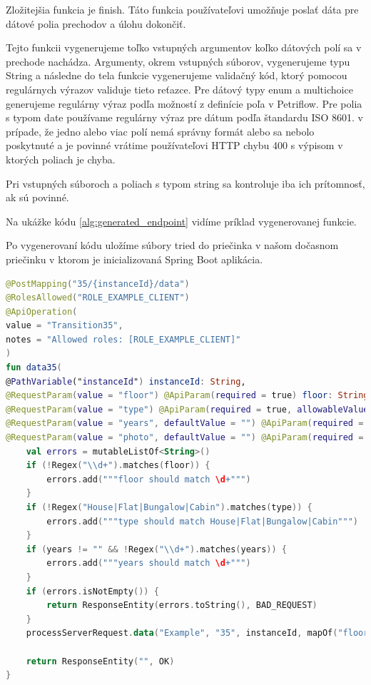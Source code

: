 
Zložitejšia funkcia je finish. Táto funkcia používateľovi umožňuje poslať dáta pre dátové polia prechodov a úlohu dokončiť.  

Tejto funkcii vygenerujeme toľko vstupných argumentov koľko dátových polí sa v prechode nachádza. Argumenty, okrem vstupných súborov, vygenerujeme typu String a následne do tela funkcie vygenerujeme validačný kód, ktorý pomocou regulárnych výrazov validuje tieto reťazce. Pre dátový typy enum a multichoice generujeme regulárny výraz podľa možností z definície poľa v Petriflow. Pre polia s typom date používame regulárny výraz pre dátum podľa štandardu ISO 8601. v prípade, že jedno alebo viac polí nemá správny formát alebo sa nebolo poskytnuté a je povinné vrátime používateľovi HTTP chybu 400 s výpisom v ktorých poliach je chyba. 


Pri vstupných súboroch a poliach s typom string sa kontroluje iba ich prítomnosť, ak sú povinné. 

Na ukážke kódu \ref{alg:generated_endpoint} vidíme príklad vygenerovanej funkcie. 

Po vygenerovaní kódu uložíme súbory tried do priečinka v našom dočasnom priečinku v ktorom je inicializovaná Spring Boot aplikácia.   

\begin{lstlisting}[float, caption={Príklad vygenerovanej funkcie},label={alg:generated_endpoint},language=Kotlin] 
@PostMapping("35/{instanceId}/data") 
@RolesAllowed("ROLE_EXAMPLE_CLIENT") 
@ApiOperation( 
value = "Transition35", 
notes = "Allowed roles: [ROLE_EXAMPLE_CLIENT]" 
) 
fun data35( 
@PathVariable("instanceId") instanceId: String, 
@RequestParam(value = "floor") @ApiParam(required = true) floor: String, 
@RequestParam(value = "type") @ApiParam(required = true, allowableValues = """[House, Flat, Bungalow, Cabin]""") type: String, 
@RequestParam(value = "years", defaultValue = "") @ApiParam(required = false) years: String, 
@RequestParam(value = "photo", defaultValue = "") @ApiParam(required = false) photo: MultipartFile ): ResponseEntity<String> { 
	val errors = mutableListOf<String>() 
	if (!Regex("\\d+").matches(floor)) { 
		errors.add("""floor should match \d+""") 
	} 
	if (!Regex("House|Flat|Bungalow|Cabin").matches(type)) { 
		errors.add("""type should match House|Flat|Bungalow|Cabin""") 
	}
	if (years != "" && !Regex("\\d+").matches(years)) { 
		errors.add("""years should match \d+""") 
	} 
	if (errors.isNotEmpty()) { 
		return ResponseEntity(errors.toString(), BAD_REQUEST) 
	} 
	processServerRequest.data("Example", "35", instanceId, mapOf("floor" to floor, "type" to type, "years" to years, "photo" to photo )) 
	
	return ResponseEntity("", OK) 
} 
\end{lstlisting} 

